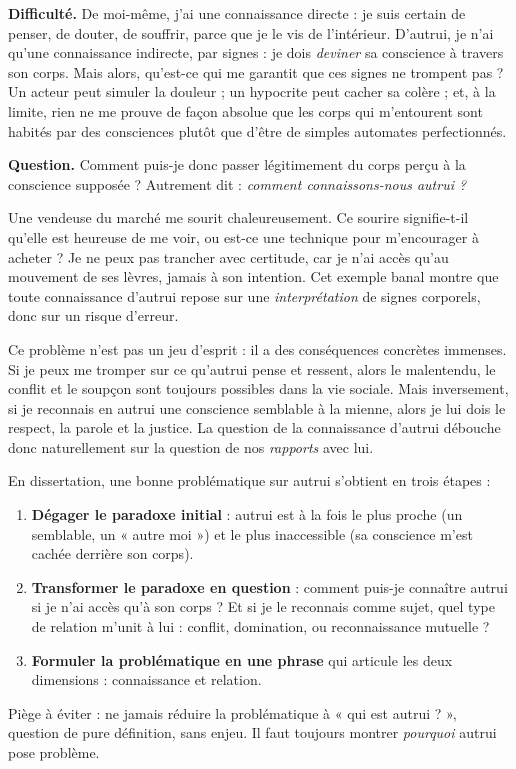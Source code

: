\documentclass[11pt]{article}
\newcounter{popsec}
\newcounter{popsub}
\newcommand{\courssub}[1]{%
  \stepcounter{popsub}%
  \par\vspace{9pt}\noindent{\popxbold\fontsize{11.5}{13}\selectfont\color{popink}{\color{poporange}\thepopsec.\thepopsub}\hspace{6pt}#1}\par\nopagebreak\vspace{4pt}
}
\begin{document}
\textbf{Difficulté.} De moi-même, j'ai une connaissance directe : je suis certain de penser, de douter, de souffrir, parce que je le vis de l'intérieur. D'autrui, je n'ai qu'une connaissance indirecte, par signes : je dois \emph{deviner} sa conscience à travers son corps. Mais alors, qu'est-ce qui me garantit que ces signes ne trompent pas ? Un acteur peut simuler la douleur ; un hypocrite peut cacher sa colère ; et, à la limite, rien ne me prouve de façon absolue que les corps qui m'entourent sont habités par des consciences plutôt que d'être de simples automates perfectionnés.

\textbf{Question.} Comment puis-je donc passer légitimement du corps perçu à la conscience supposée ? Autrement dit : \emph{comment connaissons-nous autrui ?}

\begin{exemplebox}
Une vendeuse du marché me sourit chaleureusement. Ce sourire signifie-t-il qu'elle est heureuse de me voir, ou est-ce une technique pour m'encourager à acheter ? Je ne peux pas trancher avec certitude, car je n'ai accès qu'au mouvement de ses lèvres, jamais à son intention. Cet exemple banal montre que toute connaissance d'autrui repose sur une \emph{interprétation} de signes corporels, donc sur un risque d'erreur.
\end{exemplebox}

Ce problème n'est pas un jeu d'esprit : il a des conséquences concrètes immenses. Si je peux me tromper sur ce qu'autrui pense et ressent, alors le malentendu, le conflit et le soupçon sont toujours possibles dans la vie sociale. Mais inversement, si je reconnais en autrui une conscience semblable à la mienne, alors je lui dois le respect, la parole et la justice. La question de la connaissance d'autrui débouche donc naturellement sur la question de nos \emph{rapports} avec lui.

\courssub{Problématique et annonce du plan}

\begin{methode}
En dissertation, une bonne problématique sur autrui s'obtient en trois étapes :
\begin{enumerate}
\item \textbf{Dégager le paradoxe initial} : autrui est à la fois le plus proche (un semblable, un « autre moi ») et le plus inaccessible (sa conscience m'est cachée derrière son corps).
\item \textbf{Transformer le paradoxe en question} : comment puis-je connaître autrui si je n'ai accès qu'à son corps ? Et si je le reconnais comme sujet, quel type de relation m'unit à lui : conflit, domination, ou reconnaissance mutuelle ?
\item \textbf{Formuler la problématique en une phrase} qui articule les deux dimensions : connaissance et relation.
\end{enumerate}
Piège à éviter : ne jamais réduire la problématique à « qui est autrui ? », question de pure définition, sans enjeu. Il faut toujours montrer \emph{pourquoi} autrui pose problème.
\end{methode}
\end{document}
